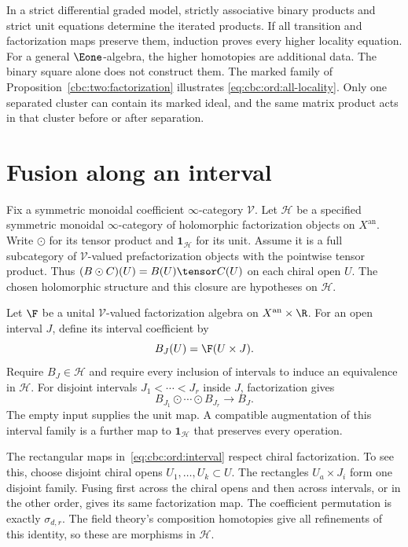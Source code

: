 In a strict differential graded model, strictly associative binary
products and strict unit equations determine the iterated products.
If all transition and factorization maps preserve them, induction
proves every higher locality equation.
For a general $\Eone$-algebra, the higher homotopies are additional
data. The binary square alone does not construct them.
The marked family of Proposition~\ref{cbc:two:factorization} illustrates
\eqref{eq:cbc:ord:all-locality}.
Only one separated cluster can contain its marked ideal, and the
same matrix product acts in that cluster before or after separation.

\section{Fusion along an interval}
Fix a symmetric monoidal coefficient $\infty$-category $\mathcal V$.
Let $\mathcal H$ be a specified symmetric monoidal $\infty$-category
of holomorphic factorization objects on $X^{\mathrm{an}}$.
Write $\odot$ for its tensor product and $\mathbf1_{\mathcal H}$
for its unit.
Assume it is a full subcategory of $\mathcal V$-valued prefactorization objects with
the pointwise tensor product.
Thus $(B\odot C)(U)=B(U)\tensor C(U)$ on each chiral open $U$.
The chosen holomorphic structure and this closure are hypotheses
on $\mathcal H$.

Let $\F$ be a unital $\mathcal V$-valued factorization algebra on
$X^{\mathrm{an}}\times\R$.
For an open interval $J$, define its interval coefficient by
\[
 B_J(U)=\F(U\times J).
\]
Require $B_J\in\mathcal H$ and require every inclusion of intervals
to induce an equivalence in $\mathcal H$.
For disjoint intervals $J_1<\cdots<J_r$ inside $J$, factorization gives
\begin{equation}
 B_{J_1}\odot\cdots\odot B_{J_r}\longrightarrow B_J.
 \label{eq:cbc:ord:interval}
\end{equation}
The empty input supplies the unit map.
A compatible augmentation of this interval family is a further
map to $\mathbf1_{\mathcal H}$ that preserves every operation.

The rectangular maps in~\eqref{eq:cbc:ord:interval} respect chiral
factorization. To see this, choose disjoint chiral opens
$U_1,\ldots,U_k\subset U$.
The rectangles $U_a\times J_i$ form one disjoint family.
Fusing first across the chiral opens and then across intervals,
or in the other order, gives its same factorization map.
The coefficient permutation is exactly $\sigma_{d,r}$.
The field theory's composition homotopies give all refinements of
this identity, so these are morphisms in $\mathcal H$.

